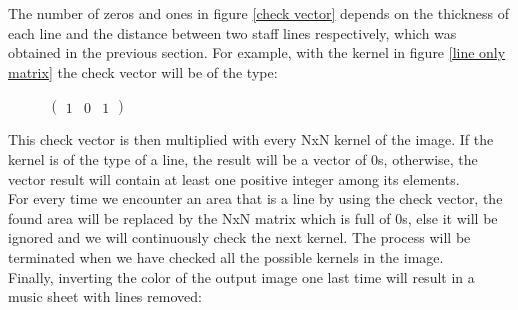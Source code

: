 \documentclass[a4paper,12pt]{report}
\begin{document}
The number of zeros and ones in figure \ref{check vector} depends on
the thickness of each line and the distance between two staff lines
respectively, which was obtained in the previous section.  For example, with the
kernel in figure \ref{line only matrix} the check vector will be of the type:

\begin{figure}[h!]
    \centering
    $
    \begin{pmatrix}
       1 & 0 & 1 
    \end{pmatrix}
    $\\
\end{figure}

 This check vector is then multiplied with every NxN kernel of the image. If the
 kernel is of the type of a line, the result will be a vector of 0s, otherwise,
 the vector result will contain at least one positive integer among its
 elements.\\

 For every time we encounter an area that is a line by using the check vector,
 the found area will be replaced by the NxN matrix which is full of 0s, else it
 will be ignored and we will continuously check the next kernel. The process
 will be terminated when we have checked all the possible kernels in the
 image.\\

\clearpage
Finally, inverting the color of the output image one last time will result in a
music sheet with lines removed:
\begin{center}
\end{center}
\end{document}
